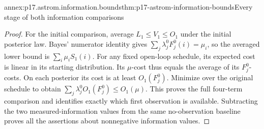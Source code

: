 \begin{annexitem}{annex:p17.astrom.information.bounds}{thm:p17-astrom-information-bounds}{Every stage of both information comparisons}
\begin{proof}
For the initial comparison, average \(L_1\leq V_1\leq O_1\)
under the initial posterior law.
Bayes' numerator identity gives
\(\sum_j\lambda_j^0F_j^0(i)=\mu_i\), so the averaged
lower bound is \(\sum_i\mu_iS_1(i)\).
For any fixed open-loop schedule, its expected cost
is linear in its starting distribution.
Its \(\mu\)-cost thus equals the average of its
\(F_j^0\)-costs. On each posterior its cost is at
least \(O_1(F_j^0)\). Minimize over the original
schedule to obtain
\(\sum_j\lambda_j^0O_1(F_j^0)\leq O_1(\mu)\).
This proves the full four-term comparison and
identifies exactly which first observation is available.
Subtracting the two measured-information values from
the same no-observation baseline proves all the
assertions about nonnegative information values.
\end{proof}
\end{annexitem}

